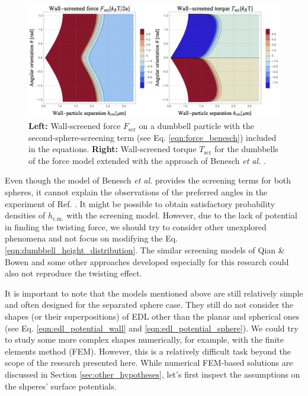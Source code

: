 \documentclass{master_thesis}
\begin{document}
\begin{figure}
    \centering
    \includegraphics[width=\linewidth]{figures/walls_screening.png}
    \caption{\textbf{Left:} Wall-screened force $F_{\textrm{scr}}$ on a dumbbell particle with the second-sphere-screening term (see Eq. \eqref{eqn:force_benesch}) included in the equations. \textbf{Right:} Wall-screened torque $T_{\textrm{scr}}$ for the dumbbells of the force model extended with the approach of Benesch \textit{et al.} \cite{benesch2005}.}
    \label{fig:walls_screening}
\end{figure}

Even though the model of Benesch \textit{et al.} provides the screening terms for both spheres, it cannot explain the observations of the preferred angles in the experiment of Ref. \cite{verweij2021}. It might be possible to obtain satisfactory probability densities of $h_{\textrm{c.m.}}$ with the screening model. However, due to the lack of potential in finding the twisting force, we should try to consider other unexplored phenomena and not focus on modifying the Eq. \eqref{eqn:dumbbell_height_distribution}. The similar screening models of Qian \& Bowen \cite{qian1999} and some other approaches developed especially for this research could also not reproduce the twisting effect.

It is important to note that the models mentioned above are still relatively simple and often designed for the separated sphere case. They still do not consider the shapes (or their superpositions) of EDL other than the planar and spherical ones (see Eq. \eqref{eqn:edl_potential_wall} and \eqref{eqn:edl_potential_sphere}). We could try to study some more complex shapes numerically, for example, with the finite elements method (FEM). However, this is a relatively difficult task beyond the scope of the research presented here. While numerical FEM-based solutions are discussed in Section \ref{sec:other_hypotheses}, let's first inspect the assumptions on the shperes' surface potentials.
\end{document}
